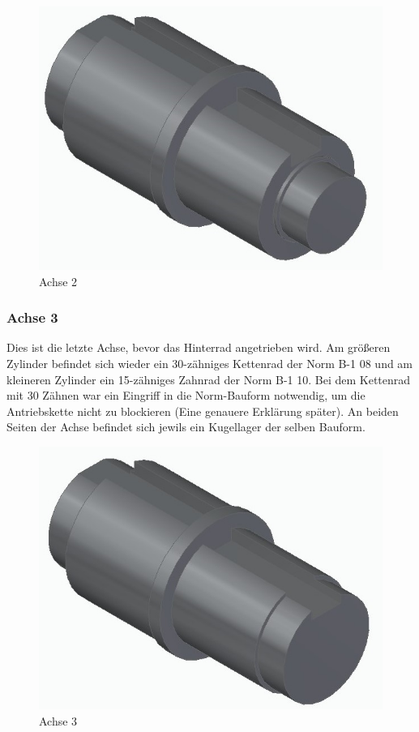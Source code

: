 \begin{figure} [H]
	\begin{center}
		\includegraphics[scale=0.5]{figures/mechanik/Achse_mit_nuten_20mm.jpg}
			\caption{Achse 2}
			\label{fig:Achse 2}
	\end{center}
\end{figure}

\subsubsection*{Achse 3}

Dies ist die letzte Achse, bevor das Hinterrad angetrieben wird. Am größeren Zylinder befindet sich wieder ein 30-zähniges Kettenrad der Norm B-1 08 und am kleineren Zylinder ein 15-zähniges Zahnrad der Norm B-1 10. Bei dem Kettenrad mit 30 Zähnen war ein Eingriff in die Norm-Bauform notwendig, um die Antriebskette nicht zu blockieren (Eine genauere Erklärung später). An beiden Seiten der Achse befindet sich jewils ein Kugellager der selben Bauform. 


\begin{figure} [H]
	\begin{center}
		\includegraphics[scale=0.5]{figures/mechanik/Achse_mit_nuten.jpg}
			\caption{Achse 3}
			\label{fig:Achse 3}
	\end{center}
\end{figure}


